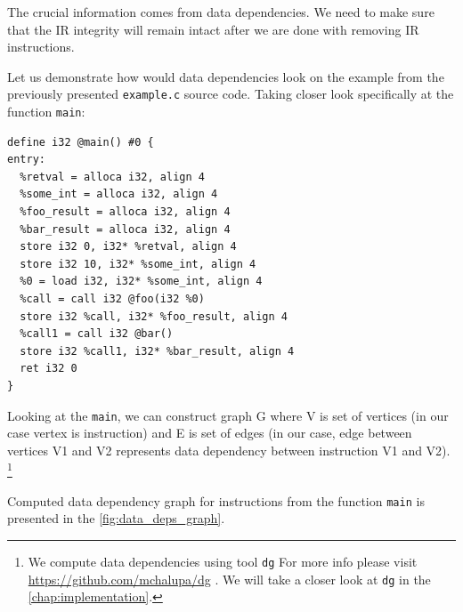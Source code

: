 \documentclass[12pt, twoside]{fithesis2}
\renewcommand{\_}{\leavevmode \kern0.07em\vbox{\hrule width0.4em}}
\begin{document}
The crucial information comes from data dependencies. We need to make sure that
the IR integrity will remain intact after we are done with removing IR
instructions.

Let us demonstrate how would data dependencies look on the example from the
previously presented \texttt{example.c} source code.
Taking closer look specifically at the function \texttt{main}:

\begin{verbatim}
define i32 @main() #0 {
entry:
  %retval = alloca i32, align 4
  %some_int = alloca i32, align 4
  %foo_result = alloca i32, align 4
  %bar_result = alloca i32, align 4
  store i32 0, i32* %retval, align 4
  store i32 10, i32* %some_int, align 4
  %0 = load i32, i32* %some_int, align 4
  %call = call i32 @foo(i32 %0)
  store i32 %call, i32* %foo_result, align 4
  %call1 = call i32 @bar()
  store i32 %call1, i32* %bar_result, align 4
  ret i32 0
}
\end{verbatim}

Looking at the \texttt{main}, we can construct graph G where V is set
of vertices (in our case vertex is instruction) and E is set of edges (in our
case, edge between vertices V1 and V2 represents data dependency between
instruction V1 and V2).
\footnote{
We compute data dependencies using tool \texttt{dg}
For more info please visit \url{https://github.com/mchalupa/dg} \cite{dg}.
We will take a closer look at \texttt{dg} in the
\autoref{chap:implementation}.
}

Computed data dependency graph for instructions from the function
\texttt{main} is presented in the \autoref{fig:data_deps_graph}.
\end{document}
